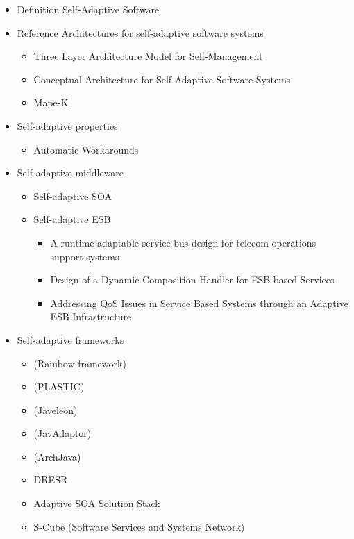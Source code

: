 \begin{itemize}
	\item Definition Self-Adaptive Software
	\item Reference Architectures for self-adaptive software systems
	\begin{itemize}
		\item Three Layer Architecture Model for Self-Management \citep{Kramer:2007ff}
		\item Conceptual Architecture for Self-Adaptive Software Systems \citep{Andersson:2009bq}
		\item Mape-K \citep{Group:2005ug}
	\end{itemize}
	\item Self-adaptive properties
	\begin{itemize}
		\item Automatic Workarounds
	\end{itemize}
	\item Self-adaptive middleware
	\begin{itemize}
		\item Self-adaptive \ac{SOA}
		\item Self-adaptive \ac{ESB}
		\begin{itemize}
			\item A runtime-adaptable service bus design for telecom operations support systems \citep{Chen:2008hj}
			\item Design of a Dynamic Composition Handler for ESB-based Services \citep{Chang:2007aa}
			\item Addressing QoS Issues in Service Based Systems through an Adaptive ESB Infrastructure \citep{Gonzalez:2011}
		\end{itemize}
	\end{itemize}
	\item Self-adaptive frameworks
	\begin{itemize}
		\item (Rainbow framework)
		\item (PLASTIC)
		\item (Javeleon)
		\item (JavAdaptor)
		\item (ArchJava)
		\item DRESR \citep{Bai:2007aa}
		\item Adaptive SOA Solution Stack \citep{Zielinnski:2012bo}
		\item S-Cube (Software Services and Systems Network)
	\end{itemize}
\end{itemize}


